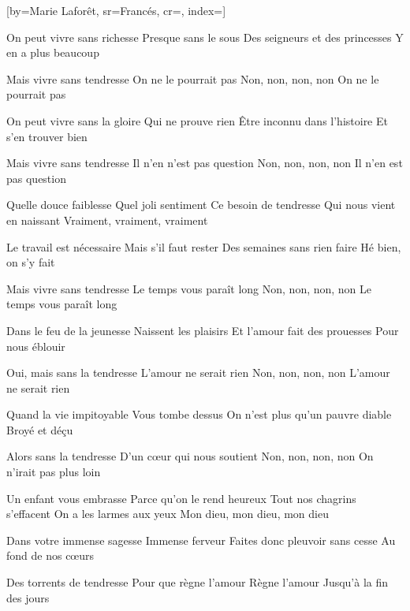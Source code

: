[by={Marie Laforêt},
                     sr={Francés},
                     cr={},
                     index={}]

\beginverse
On peut vivre sans richesse
Presque sans le sous
Des seigneurs et des princesses
Y en a plus beaucoup
\endverse

\beginverse
Mais vivre sans tendresse
On ne le pourrait pas
Non, non, non, non
On ne le pourrait pas
\endverse

\beginverse
On peut vivre sans la gloire
Qui ne prouve rien
Être inconnu dans l'histoire
Et s'en trouver bien
\endverse

\beginverse
Mais vivre sans tendresse
Il n'en n'est pas question
Non, non, non, non
Il n'en est pas question
\endverse

\beginverse
Quelle douce faiblesse
Quel joli sentiment
Ce besoin de tendresse
Qui nous vient en naissant
Vraiment, vraiment, vraiment
\endverse

\beginverse
Le travail est nécessaire
Mais s'il faut rester
Des semaines sans rien faire
Hé bien, on s'y fait
\endverse

\beginverse
Mais vivre sans tendresse
Le temps vous paraît long
Non, non, non, non
Le temps vous paraît long
\endverse

\beginverse
Dans le feu de la jeunesse
Naissent les plaisirs
Et l'amour fait des prouesses
Pour nous éblouir
\endverse

\beginverse
Oui, mais sans la tendresse
L'amour ne serait rien
Non, non, non, non
L'amour ne serait rien
\endverse

\beginverse
Quand la vie impitoyable
Vous tombe dessus
On n'est plus qu'un pauvre diable
Broyé et déçu
\endverse

\beginverse
Alors sans la tendresse
D'un cœur qui nous soutient
Non, non, non, non
On n'irait pas plus loin
\endverse

\beginverse
Un enfant vous embrasse
Parce qu'on le rend heureux
Tout nos chagrins s'effacent
On a les larmes aux yeux
Mon dieu, mon dieu, mon dieu
\endverse

\beginverse
Dans votre immense sagesse
Immense ferveur
Faites donc pleuvoir sans cesse
Au fond de nos cœurs
\endverse

\beginverse
Des torrents de tendresse
Pour que règne l'amour
Règne l'amour
Jusqu'à la fin des jours
\endverse

\endsong